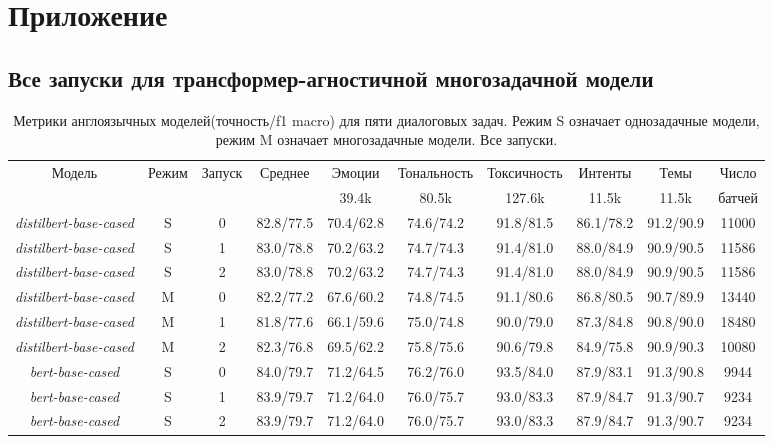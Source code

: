 \chapter{Приложение}\label{appendix}

\section{Все запуски для трансформер-агностичной многозадачной модели}\label{appendix:allruns_tr-ag}


\begin{table*}
\caption{Метрики англоязычных моделей(точность/f1 macro) для пяти диалоговых задач. Режим S означает однозадачные модели, режим M означает многозадачные модели. Все запуски.}
\label{appendix:tr-ag:en_results}
\begin{tabular}{|c|c|c||c|c|c|c|c|c||c|} \hline
\multirow{2}{*}{Модель} & \multirow{2}{*}{Режим} &  \multirow{2}{*}{Запуск} &\multirow{2}{*}{Среднее} & Эмоции & Тональность & Токсичность & Интенты & Темы & Число \\
& & & & 39.4k & 80.5k & 127.6k & 11.5k & 11.5k & батчей \\ \hline \hline
\textit{distilbert-base-cased}  & S & 0 & 82.8/77.5 & 70.4/62.8 & 74.6/74.2 & 91.8/81.5 & 86.1/78.2 & 91.2/90.9 & 11000 \\ \hline
\textit{distilbert-base-cased}  & S & 1 & 83.0/78.8 & 70.2/63.2 & 74.7/74.3 & 91.4/81.0 & 88.0/84.9 & 90.9/90.5 & 11586 \\ \hline
\textit{distilbert-base-cased} & S & 2 & 83.0/78.8 & 70.2/63.2 & 74.7/74.3 & 91.4/81.0 & 88.0/84.9 & 90.9/90.5 & 11586 \\ \hline
\textit{distilbert-base-cased} & M & 0 & 82.2/77.2 & 67.6/60.2 & 74.8/74.5 & 91.1/80.6 & 86.8/80.5 & 90.7/89.9 & 13440 \\ \hline
\textit{distilbert-base-cased} & M & 1 & 81.8/77.6 & 66.1/59.6 & 75.0/74.8 & 90.0/79.0 & 87.3/84.8 & 90.8/90.0 & 18480 \\ \hline
\textit{distilbert-base-cased} & M & 2 & 82.3/76.8 & 69.5/62.2 & 75.8/75.6 & 90.6/79.8 & 84.9/75.8 & 90.9/90.3 & 10080 \\ \hline
\textit{bert-base-cased} & S & 0 & 84.0/79.7 & 71.2/64.5 & 76.2/76.0 & 93.5/84.0 & 87.9/83.1 & 91.3/90.8 & 9944 \\ \hline
\textit{bert-base-cased} & S & 1 & 83.9/79.7 & 71.2/64.0 & 76.0/75.7 & 93.0/83.3 & 87.9/84.7 & 91.3/90.7 & 9234 \\ \hline
\textit{bert-base-cased} & S & 2 & 83.9/79.7 & 71.2/64.0 & 76.0/75.7 & 93.0/83.3 & 87.9/84.7 & 91.3/90.7 & 9234 \\ \hline

\end{tabular}
\end{table*}
